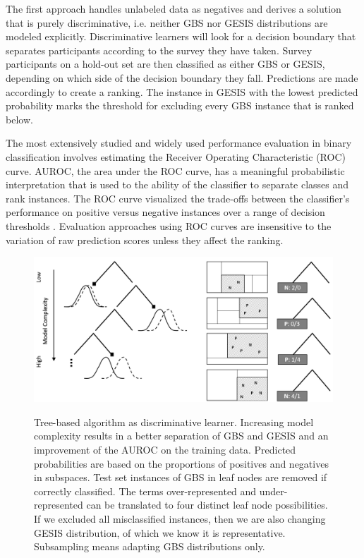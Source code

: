 The first approach handles unlabeled data as negatives and derives a solution that is purely discriminative, i.e. neither GBS nor GESIS distributions are modeled explicitly. Discriminative learners will look for a decision boundary that separates participants according to the survey they have taken. Survey participants on a hold-out set are then classified as either GBS or GESIS, depending on which side of the decision boundary they fall. Predictions are made accordingly to create a ranking. The instance in GESIS with the lowest predicted probability marks the threshold for excluding every GBS instance that is ranked below.

The most extensively studied and widely used performance evaluation in binary classiﬁcation involves estimating the Receiver Operating Characteristic (ROC) curve. AUROC, the area under the ROC curve, has a meaningful probabilistic interpretation that is used to the ability of the classiﬁer to separate classes and rank instances. The ROC curve visualized the trade-offs between the classifier's performance on positive versus negative instances over a range of decision thresholds \cite{roc}. Evaluation approaches using ROC curves are insensitive to the variation of raw prediction scores unless they affect the ranking.

\vspace{1cm}
\begin{figure}[ht]
	\begin{center}
		\captionsetup{width= 380pt}
		\includegraphics[scale=0.32,angle=0]{fig/tree}
		\label{project}
		\caption{Tree-based algorithm as discriminative learner. Increasing model complexity results in a better separation of GBS and GESIS and an improvement of the AUROC on the training data. Predicted probabilities are based on the proportions of positives and negatives in subspaces. Test set instances of GBS in leaf nodes are removed if correctly classified. The terms over-represented and under-represented can be translated to four distinct leaf node possibilities. If we excluded all misclassified instances, then we are also changing GESIS distribution, of which we know it is representative. Subsampling means adapting GBS distributions only.}
	\end{center}
\end{figure}

